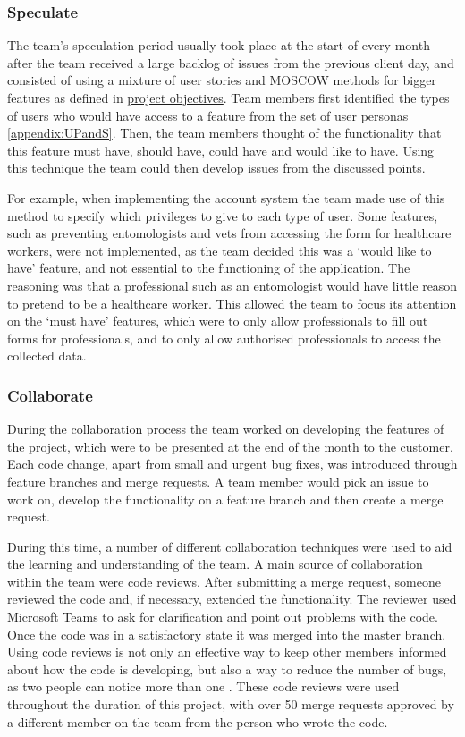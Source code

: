 \documentclass{l3proj}
\begin{document}
\subsubsection{Speculate}
\label{speculate}
The team's speculation period usually took place at the start of every month after the team received a large backlog of issues from the previous client day, and consisted of using a mixture of user stories and MOSCOW \cite{MOSCOW} methods for bigger features as defined in \hyperref[sec:background]{project objectives}. Team members first identified the types of users who would have access to a feature from the set of user personas \ref{appendix:UPandS}. Then, the team members thought of the functionality that this feature must have, should have, could have and would like to have. Using this technique the team could then develop issues from the discussed points. 

For example, when implementing the account system the team made use of this method to specify which privileges to give to each type of user. Some features, such as preventing entomologists and vets from accessing the form for healthcare workers, were not implemented, as the team decided this was a `would like to have' feature, and not essential to the functioning of the application. The reasoning was that a professional such as an entomologist would have little reason to pretend to be a healthcare worker. This allowed the team to focus its attention on the `must have' features, which were to only allow professionals to fill out forms for professionals, and to only allow authorised professionals to access the collected data.


\subsubsection{Collaborate}
\label{collab}
During the collaboration process the team worked on developing the features of the project, which were to be presented at the end of the month to the customer. Each code change, apart from small and urgent bug fixes, was introduced through feature branches and merge requests. A team member would pick an issue to work on, develop the functionality on a feature branch and then create a merge request.

During this time, a number of different collaboration techniques were used to aid the learning and understanding of the team. A main source of collaboration within the team were code reviews. After submitting a merge request, someone reviewed the code and, if necessary, extended the functionality. The reviewer used Microsoft Teams to ask for clarification and point out problems with the code. Once the code was in a satisfactory state it was merged into the master branch. Using code reviews is not only an effective way to keep other members informed about how the code is developing, but also a way to reduce the number of bugs, as two people can notice more than one \cite{Inspections}. These code reviews were used throughout the duration of this project, with over 50 merge requests approved by a different member on the team from the person who wrote the code.
\end{document}
